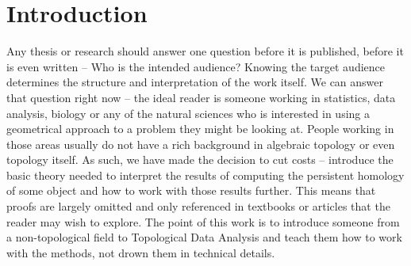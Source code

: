 \chapter*{Introduction}

Any thesis or research should answer one question before it is published, before it is even written -- Who is the intended audience? Knowing the target audience determines the structure and interpretation of the work itself. We can answer that question right now -- the ideal reader is someone working in statistics, data analysis, biology or any of the natural sciences who is interested in using a geometrical approach to a problem they might be looking at. People working in those areas usually do not have a rich background in algebraic topology or even topology itself. As such, we have made the decision to cut costs -- introduce the basic theory needed to interpret the results of computing the persistent homology of some object and how to work with those results further. This means that proofs are largely omitted and only referenced in textbooks or articles that the reader may wish to explore. The point of this work is to introduce someone from a non-topological field to Topological Data Analysis and teach them how to work with the methods, not drown them in technical details.
